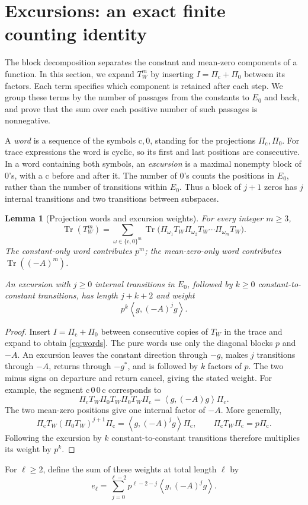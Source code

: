 \documentclass[11pt]{article}
\numberwithin{equation}{section}
\newtheorem{lemma}[theorem]{Lemma}
\newcommand{\Tr}{\operatorname{Tr}}
\newcommand{\ip}[2]{\left\langle #1,#2\right\rangle}
\begin{document}
\section{Excursions: an exact finite counting identity}\label{sec:excursions}
The block decomposition separates the constant and mean-zero
components of a function. In this section, we expand $T_W^m$ by
inserting $I=\Pi_{\mathrm c}+\Pi_0$ between its factors. Each term
specifies which component is retained after each step. We group
these terms by the number of passages from the constants to $E_0$
and back, and prove that the sum over each positive number of such
passages is nonnegative.

A \emph{word} is a sequence of the symbols $\mathrm c,0$, standing
for the projections $\Pi_{\mathrm c},\Pi_0$. For trace expressions
the word is cyclic, so its first and last positions are consecutive.
In a word containing both symbols, an \emph{excursion} is a maximal
nonempty block of $0$'s, with a $\mathrm c$ before and after it.
The number of $0$'s counts the positions in $E_0$, rather than the
number of transitions within $E_0$. Thus a block of $j+1$ zeros
has $j$ internal transitions and two transitions between subspaces.

\begin{lemma}[Projection words and excursion weights]\label{lem:words}
For every integer $m\ge3$,
\begin{equation}\label{eq:words}
 \Tr(T_W^m)=\sum_{\omega\in\{\mathrm c,0\}^m}
 \Tr\bigl(\Pi_{\omega_1}T_W\Pi_{\omega_2}T_W\cdots\Pi_{\omega_m}T_W\bigr).
\end{equation}
The constant-only word contributes $p^m$; the mean-zero-only word
contributes $\Tr((-A)^m)$.

An excursion with $j\ge0$ internal transitions in $E_0$, followed by $k\ge0$ constant-to-constant transitions, has length $j+k+2$ and weight
\[
 p^k\ip{g}{(-A)^j g}.
\]
\end{lemma}
\begin{proof}
Insert $I=\Pi_{\mathrm c}+\Pi_0$ between consecutive copies of $T_W$ in
the trace and expand to obtain \eqref{eq:words}. The pure words
use only the diagonal blocks $p$ and $-A$. An excursion leaves
the constant direction through $-g$, makes $j$ transitions through
$-A$, returns through $-g^*$, and is followed by $k$ factors of
$p$. The two minus signs on departure and return cancel, giving
the stated weight. For example, the segment $\mathrm c\,0\,0\,\mathrm c$
corresponds to
\[
 \Pi_{\mathrm c}T_W\Pi_0T_W\Pi_0T_W\Pi_{\mathrm c}
   =\ip g{(-A)g}\Pi_{\mathrm c}.
\]
The two mean-zero positions give one internal factor of $-A$.
More generally,
\[
 \Pi_{\mathrm c}T_W(\Pi_0T_W)^{j+1}\Pi_{\mathrm c}
  =\ip g{(-A)^jg}\Pi_{\mathrm c},
 \qquad \Pi_{\mathrm c}T_W\Pi_{\mathrm c}=p\Pi_{\mathrm c}.
\]
Following the excursion by $k$ constant-to-constant transitions
therefore multiplies its weight by $p^k$.
\end{proof}
For $\ell\ge2$, define the sum of these weights at total length $\ell$ by
\begin{equation}\label{eq:e}
 e_\ell=\sum_{j=0}^{\ell-2}p^{\ell-2-j}\ip{g}{(-A)^j g}.
\end{equation}
\end{document}
